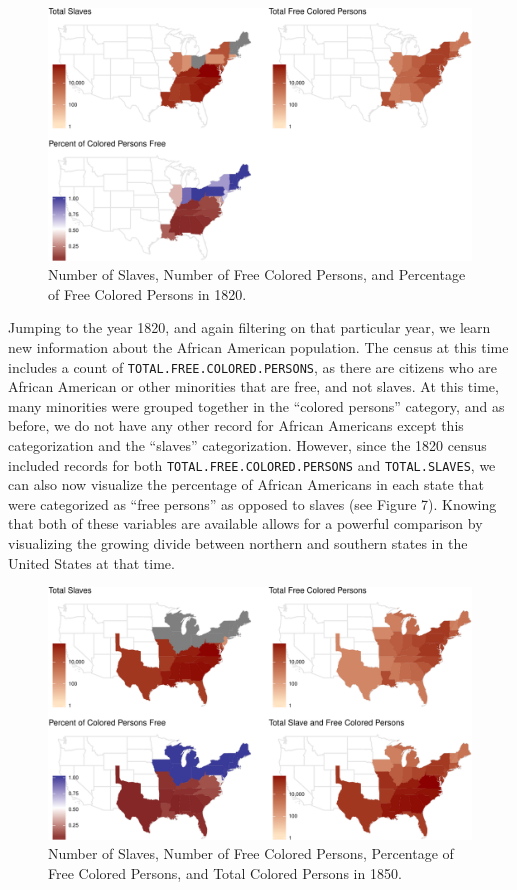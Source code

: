 \documentclass[11pt,]{article}
\begin{document}
\begin{figure}[htbp]
\centering
\includegraphics{writeup_files/figure-latex/unnamed-chunk-5-1.pdf}
\caption{Number of Slaves, Number of Free Colored Persons, and
Percentage of Free Colored Persons in 1820.}
\end{figure}

Jumping to the year 1820, and again filtering on that particular year,
we learn new information about the African American population. The
census at this time includes a count of
\texttt{TOTAL.FREE.COLORED.PERSONS}, as there are citizens who are
African American or other minorities that are free, and not slaves. At
this time, many minorities were grouped together in the ``colored
persons'' category, and as before, we do not have any other record for
African Americans except this categorization and the ``slaves''
categorization. However, since the 1820 census included records for both
\texttt{TOTAL.FREE.COLORED.PERSONS} and \texttt{TOTAL.SLAVES}, we can
also now visualize the percentage of African Americans in each state
that were categorized as ``free persons'' as opposed to slaves (see
Figure 7). Knowing that both of these variables are available allows for
a powerful comparison by visualizing the growing divide between northern
and southern states in the United States at that time.

\begin{figure}[htbp]
\centering
\includegraphics{writeup_files/figure-latex/unnamed-chunk-6-1.pdf}
\caption{Number of Slaves, Number of Free Colored Persons, Percentage of
Free Colored Persons, and Total Colored Persons in 1850.}
\end{figure}
\end{document}

